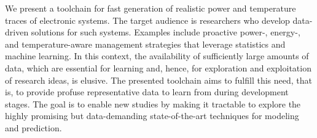 We present a toolchain for fast generation of realistic power and temperature
traces of electronic systems. The target audience is researchers who develop
data-driven solutions for such systems. Examples include proactive
\mbox{power-,} \mbox{energy-,} and temperature-aware management strategies that
leverage statistics and machine learning. In this context, the availability of
sufficiently large amounts of data, which are essential for learning and, hence,
for exploration and exploitation of research ideas, is elusive. The presented
toolchain aims to fulfill this need, that is, to provide profuse representative
data to learn from during development stages. The goal is to enable new studies
by making it tractable to explore the highly promising but data-demanding
state-of-the-art techniques for modeling and prediction.
